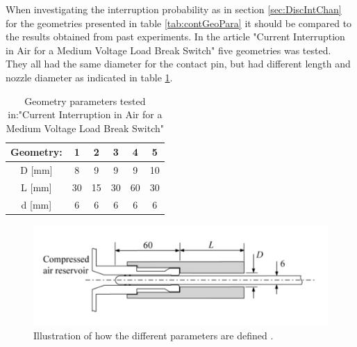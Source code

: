 \documentclass[10pt,a4paper,twoside]{article}
\begin{document}
\makeatletter 
\renewcommand{\thetable}{B.\@arabic\c@table}
\makeatother

When investigating the interruption probability as in section \ref{sec:DiscIntChan} for the geometries presented in table \ref{tab:contGeoPara} it should be compared to the results obtained from past experiments. In the article "Current Interruption in Air for a Medium Voltage Load Break Switch" \cite{bib:CIAMVLBS} five geometries was tested. They all had the same diameter for the contact pin, but had different length and nozzle diameter as indicated in table \ref{tab:contactParaMVALBS}.
\begin{table} [H]
\center
\caption{Geometry parameters tested in:"Current Interruption in Air for a Medium Voltage Load Break Switch"}
\begin{tabular}{|c|c|c|c|c|c|}
\hline 
Geometry: & 1 & 2 & 3 & 4 & 5 \\ 
\hline 
D [mm] & 8 & 9 & 9 & 9 & 10 \\ 
\hline 
L [mm] & 30 & 15 & 30 & 60 & 30 \\ 
\hline 
d [mm] & 6 & 6 & 6 & 6 & 6 \\ 
\hline 
\end{tabular}
\label{tab:contactParaMVALBS}
\end{table}

\begin{figure}[H]
\centering
	\includegraphics[scale=0.6]{Bilder/Discussion/paraDefine.png}
	\caption{Illustration of how the different parameters are defined  \cite{bib:CIAMVLBS}.}
	\label{fig:paraDefMVALBS}
\end{figure}
\end{document}
